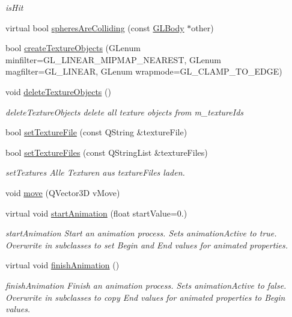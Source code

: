 \begin{DoxyCompactItemize}
\begin{DoxyCompactList}\small\item\em is\+Hit \end{DoxyCompactList}\item 
virtual bool \mbox{\hyperlink{class_g_l_body_ab34746fd9ba6a8a0ba0a8e2b04e0fad3}{spheres\+Are\+Colliding}} (const \mbox{\hyperlink{class_g_l_body}{G\+L\+Body}} $\ast$other)
\item 
bool \mbox{\hyperlink{class_g_l_body_a760a4221bb18ac880c10c41984e4257b}{create\+Texture\+Objects}} (G\+Lenum minfilter=G\+L\+\_\+\+L\+I\+N\+E\+A\+R\+\_\+\+M\+I\+P\+M\+A\+P\+\_\+\+N\+E\+A\+R\+E\+ST, G\+Lenum magfilter=G\+L\+\_\+\+L\+I\+N\+E\+AR, G\+Lenum wrapmode=G\+L\+\_\+\+C\+L\+A\+M\+P\+\_\+\+T\+O\+\_\+\+E\+D\+GE)
\item 
void \mbox{\hyperlink{class_g_l_body_abf93cad4d78b161c63f2990ef3f618e4}{delete\+Texture\+Objects}} ()
\begin{DoxyCompactList}\small\item\em delete\+Texture\+Objects delete all texture objects from m\+\_\+texture\+Ids \end{DoxyCompactList}\item 
bool \mbox{\hyperlink{class_g_l_body_ac912257e45e99c68c011da7f2d5d3708}{set\+Texture\+File}} (const Q\+String \&texture\+File)
\item 
bool \mbox{\hyperlink{class_g_l_body_a1338ad47f62e8a12f280ad169e78cd09}{set\+Texture\+Files}} (const Q\+String\+List \&texture\+Files)
\begin{DoxyCompactList}\small\item\em set\+Textures Alle Texturen aus texture\+Files laden. \end{DoxyCompactList}\item 
void \mbox{\hyperlink{class_g_l_body_aa716fdbc46e14434e28b893dad1b87f1}{move}} (Q\+Vector3D v\+Move)
\item 
virtual void \mbox{\hyperlink{class_g_l_body_a5620eb1389c1aeb5694e4e7fc8a9e88c}{start\+Animation}} (float start\+Value=0.)
\begin{DoxyCompactList}\small\item\em start\+Animation Start an animation process. Sets animation\+Active to true. Overwrite in subclasses to set Begin and End values for animated properties. \end{DoxyCompactList}\item 
virtual void \mbox{\hyperlink{class_g_l_body_a1bcb3503a1758fef20d2bb1f9726b85a}{finish\+Animation}} ()
\begin{DoxyCompactList}\small\item\em finish\+Animation Finish an animation process. Sets animation\+Active to false. Overwrite in subclasses to copy End values for animated properties to Begin values. \end{DoxyCompactList}\item 

\end{DoxyCompactItemize}

